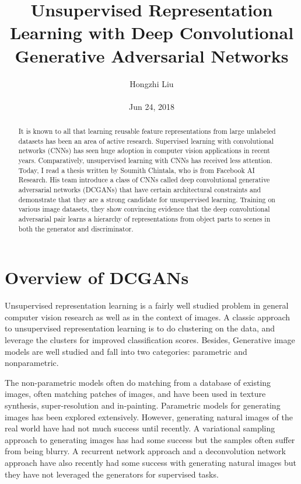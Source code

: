 \documentclass[10pt,twocolumn,letterpaper]{article}
\title{Unsupervised Representation Learning with Deep Convolutional Generative Adversarial Networks}
\author{Hongzhi Liu\\\\
Jun 24, 2018}
\begin{document}
\maketitle
\begin{abstract}
	It is known to all that learning reusable feature representations from large unlabeled datasets has been an area of active research. Supervised learning with convolutional networks (CNNs) has seen huge adoption in computer vision applications in recent years. Comparatively, unsupervised learning with CNNs has received less attention. Today, I read a thesis written by Soumith Chintala, who is from Facebook AI Research. His team introduce a class of CNNs called deep convolutional generative adversarial networks (DCGANs) that have certain architectural constraints and demonstrate that they are a strong candidate for unsupervised learning. Training on various image datasets, they show convincing evidence that the deep convolutional adversarial pair learns a hierarchy of representations from object parts to scenes in both the generator and discriminator.
\end{abstract}
\section{Overview of DCGANs}

Unsupervised representation learning is a fairly well studied problem in general computer vision research as well as in the context of images. A classic approach to unsupervised representation learning is to do clustering on the data, and leverage the clusters for improved classification scores. Besides, Generative image models are well studied and fall into two categories: parametric and nonparametric. 

The non-parametric models often do matching from a database of existing images, often matching patches of images, and have been used in texture synthesis, super-resolution and in-painting. Parametric models for generating images has been explored extensively. However, generating natural images of the real world have had not much success until recently. A variational sampling approach to generating images \cite{Kingma2013Auto} has had some success but the samples often suffer from being blurry. A recurrent network approach \cite{Gregor2015DRAW} and a deconvolution network approach \cite{Dosovitskiy2015Learning} have also recently had some success with generating natural images but they have not leveraged the generators for supervised tasks.
\end{document}
